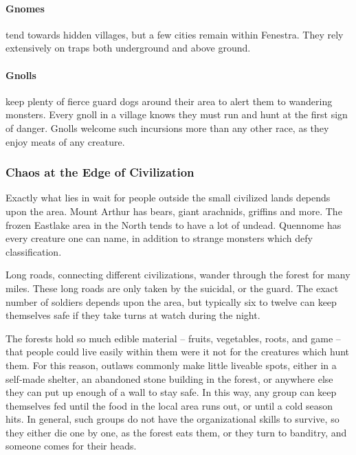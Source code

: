 \begin{multicols}{2}
\paragraph{Gnomes} tend towards hidden villages, but a few cities remain within Fenestra.
They rely extensively on traps both underground and above ground.

\paragraph{Gnolls} keep plenty of fierce guard dogs around their area to alert them to wandering monsters.
Every gnoll in a village knows they must run and hunt at the first sign of danger.
Gnolls welcome such incursions more than any other race, as they enjoy meats of any creature.

\subsubsection{Chaos at the Edge of Civilization}

Exactly what lies in wait for people outside the small civilized lands depends upon the area.
Mount Arthur has bears, giant arachnids, griffins and more.
The frozen Eastlake area in the North tends to have a lot of undead.
Quennome has every creature one can name, in addition to strange monsters which defy classification.

Long roads, connecting different civilizations, wander through the forest for many miles.
These long roads are only taken by the suicidal, or the \gls{guard}.
The exact number of soldiers depends upon the area, but typically six to twelve can keep themselves safe if they take turns at watch during the night.

The forests hold so much edible material -- fruits, vegetables, roots, and game -- that people could live easily within them were it not for the creatures which hunt them.
For this reason, outlaws commonly make little liveable spots, either in a self-made shelter, an abandoned stone building in the forest, or anywhere else they can put up enough of a wall to stay safe.
In this way, any group can keep themselves fed until the food in the local area runs out, or until a cold season hits.
In general, such groups do not have the organizational skills to survive, so they either die one by one, as the forest eats them, or they turn to banditry, and someone comes for their heads.


\end{multicols}
